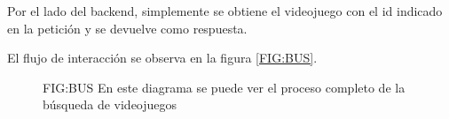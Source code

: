 Por el lado del backend, simplemente se obtiene el videojuego con el id indicado en la petición y se devuelve como respuesta.

El flujo de interacción se observa en la figura \ref{FIG:BUS}.

\begin{figure}[Componentes implicados para la pantalla de inicio]{FIG:BUS}{ En este diagrama se puede ver el proceso completo de la búsqueda de videojuegos}
\end{figure}

